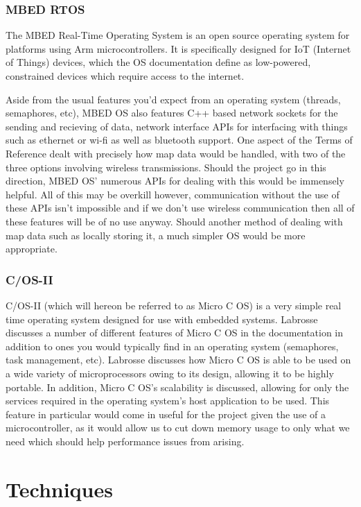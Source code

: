 					\subsubsection{MBED RTOS}
					The MBED Real-Time Operating System is an open source operating system for platforms using Arm microcontrollers. It is specifically designed for IoT (Internet of Things) devices, which the OS documentation\citep{mbedrtosdocs} define as low-powered, constrained devices which require access to the internet.
					
					Aside from the usual features you'd expect from an operating system (threads, semaphores, etc), MBED OS also features C++ based network sockets for the sending and recieving of data, network interface APIs for interfacing with things such as ethernet or wi-fi as well as bluetooth support. One aspect of the Terms of Reference dealt with precisely how map data would be handled, with two of the three options involving wireless transmissions. Should the project go in this direction, MBED OS' numerous APIs for dealing with this would be immensely helpful. All of this may be overkill however, communication without the use of these APIs isn't impossible and if we don't use wireless communication then all of these features will be of no use anyway. Should another method of dealing with map data such as locally storing it, a much simpler OS would be more appropriate.
					
					\subsubsection{\textmu C/OS-II}
					\textmu C/OS-II (which will hereon be referred to as Micro C OS) is a very simple real time operating system designed for use with embedded systems. Labrosse\citep{labrosse2002microc} discusses a number of different features of Micro C OS in the documentation in addition to ones you would typically find in an operating system (semaphores, task management, etc). Labrosse discusses how Micro C OS is able to be used on a wide variety of microprocessors owing to its design, allowing it to be highly portable. In addition, Micro C OS's scalability is discussed, allowing for only the services required in the operating system's host application to be used. This feature in particular would come in useful for the project given the use of a microcontroller, as it would allow us to cut down memory usage to only what we need which should help performance issues from arising.
			
			
			\section{Techniques}
